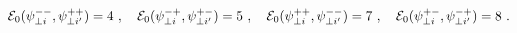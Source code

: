 \begin{equation}
{\cal E}_0 ( \psi^{--}_{\perp i}, \psi^{++}_{\perp i'} ) = 4 ~,~~~
{\cal E}_0 ( \psi^{-+}_{\perp i}, \psi^{+-}_{\perp i'} ) = 5 ~,~~~
{\cal E}_0 ( \psi^{++}_{\perp i}, \psi^{--}_{\perp i'} ) = 7 ~,~~~
{\cal E}_0 ( \psi^{+-}_{\perp i}, \psi^{-+}_{\perp i'} ) = 8 ~.
\end{equation}

